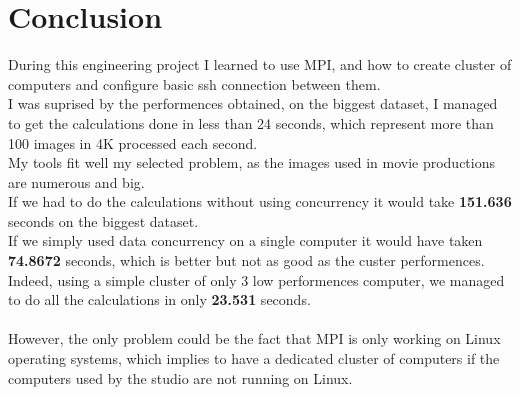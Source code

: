 \section{Conclusion}
During this engineering project I learned to use MPI, and how to create cluster of computers and configure basic ssh connection between them.\\
I was suprised by the performences obtained, on the biggest dataset, I managed to get the calculations done in less than 24 seconds, which represent more than 100 images in 4K processed each second.\\
My tools fit well my selected problem, as the images used in movie productions are numerous and big.\\
If we had to do the calculations without using concurrency it would take \textbf{151.636} seconds on the biggest dataset.\\
If we simply used data concurrency on a single computer it would have taken \textbf{74.8672} seconds, which is better but not as good as the custer performences.\\
Indeed, using a simple cluster of only 3 low performences computer, we managed to do all the calculations in only \textbf{23.531} seconds.\\
\\
However, the only problem could be the fact that MPI is only working on Linux operating systems, which implies to have a dedicated cluster of computers if the computers used by the studio are not running on Linux.